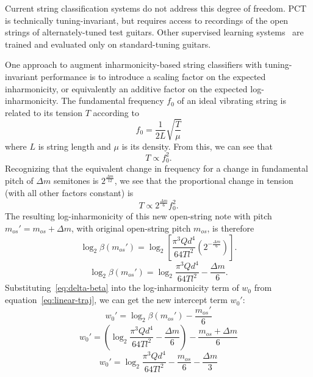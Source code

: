 \documentclass[convention,peer-reviewed]{aesconf}
\begin{document}
Current string classification systems do not address this degree of freedom. PCT~\cite{barbanchoi2012} is technically tuning-invariant, but requires access to recordings of the open strings of alternately-tuned test guitars. Other supervised learning systems~\cite{kehling2014, dittmar2013, abesser2012} are trained and evaluated only on standard-tuning guitars.

One approach to augment inharmonicity-based string classifiers with tuning-invariant performance is to introduce a scaling factor on the expected inharmonicity, or equivalently an additive factor on the expected log-inharmonicity. The fundamental frequency $f_0$ of an ideal vibrating string is related to its tension $T$ according to
\begin{equation}
f_0 = \frac{1}{2L}\sqrt{\frac{T}{\mu}}
\label{eq:freq-tension}
\end{equation}
where $L$ is string length and $\mu$ is its density. From this, we can see that
\begin{equation}
T \propto f_0^{2}.
\end{equation}
Recognizing that the equivalent change in frequency for a change in fundamental pitch of $\Delta m$ semitones is $2^{\frac{\Delta m}{12}}$, we see that the proportional change in tension (with all other factors constant) is
\begin{equation}
T \propto 2^{\frac{\Delta m}{6}}f_0^2.
\end{equation}
The resulting log-inharmonicity of this new open-string note with pitch $m_{os}' = m_{os}+\Delta m$, with original open-string pitch $m_{os}$, is therefore
\begin{equation}
\log_2\beta(m_{os}') = \log_2[ \frac{\pi^3 Q d^4}{64 T l^2}(2^{-\frac{\Delta m}{6}})].
\end{equation}
\begin{equation}
\label{eq:delta-beta}
\log_2\beta(m_{os}') = \log_2\frac{\pi^3 Q d^4}{64 T l^2} - \frac{\Delta m}{6}.
\end{equation}
Substituting~\eqref{eq:delta-beta} into the log-inharmonicity term of $w_0$ from equation~\eqref{eq:linear-traj}, we can get the new intercept term $w_0':$
\begin{equation}
w_{0}' = \log_2{\beta}(m_{os}') - \frac{m_{os}'}{6}
\end{equation}
\begin{equation}
w_{0}' = (\log_2\frac{\pi^3 Q d^4}{64 T l^2} - \frac{\Delta m}{6}) - \frac{m_{os}+\Delta m}{6}
\end{equation}
\begin{equation}
\label{eq:3.17}
w_{0}' = \log_2\frac{\pi^3 Q d^4}{64 T l^2} - \frac{m_{os}}{6} - \frac{\Delta m}{3}
\end{equation}
\end{document}
